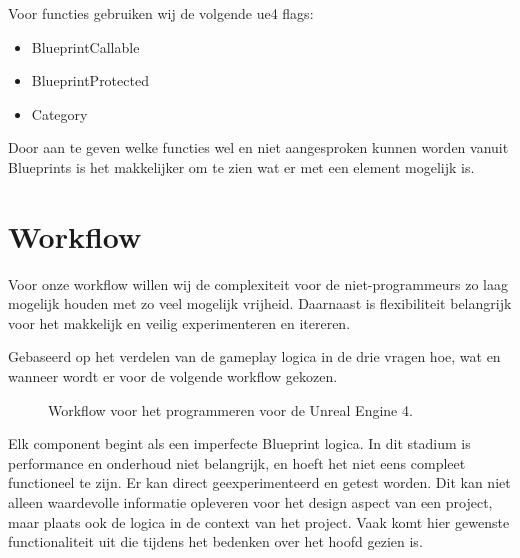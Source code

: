 Voor functies gebruiken wij de volgende \gls{ue4} flags:

\begin{itemize}
	\item BlueprintCallable
	\item BlueprintProtected
	\item Category
\end{itemize}

Door aan te geven welke functies wel en niet aangesproken kunnen worden vanuit Blueprints is het makkelijker om te zien wat er met een element mogelijk is.

\section{Workflow}
\label{sec:workflow}
Voor onze workflow willen wij de complexiteit voor de niet-programmeurs zo laag mogelijk houden met zo veel mogelijk vrijheid. Daarnaast is flexibiliteit belangrijk voor het makkelijk en veilig experimenteren en itereren.

Gebaseerd op het verdelen van de gameplay logica in de drie vragen hoe, wat en wanneer wordt er voor de volgende workflow gekozen.
    
\begin{figure}[H]
	\centering
	\caption{Workflow voor het programmeren voor de Unreal Engine 4.}
	\label{fig:workflow}
\end{figure}

Elk component begint als een imperfecte Blueprint logica. In dit stadium is performance en onderhoud niet belangrijk, en hoeft het niet eens compleet functioneel te zijn. Er kan direct geexperimenteerd en getest worden. Dit kan niet alleen waardevolle informatie opleveren voor het design aspect van een project, maar plaats ook de logica in de context van het project. Vaak komt hier gewenste functionaliteit uit die tijdens het bedenken over het hoofd gezien is.

